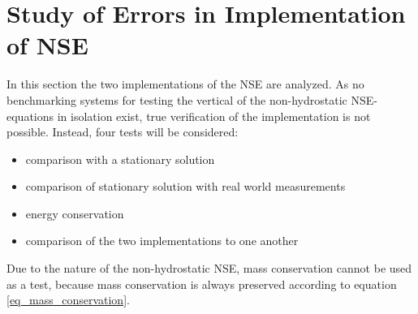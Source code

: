 

\section{Study of Errors in Implementation of NSE}
In this section the two implementations of the NSE are analyzed.
As no benchmarking systems for testing the vertical of the non-hydrostatic NSE-equations in isolation exist, true verification of the implementation is not possible.
Instead, four tests will be considered:
\begin{itemize}
\item comparison with a stationary solution
\item comparison of stationary solution with real world measurements
\item energy conservation
\item comparison of the two implementations to one another
\end{itemize}
Due to the nature of the non-hydrostatic NSE, mass conservation cannot be used as a test, because mass conservation is always preserved according to equation \ref{eq_mass_conservation}.

